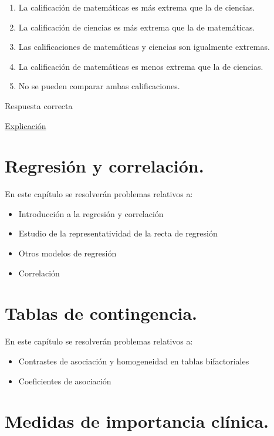 \documentclass[
]{book}
\providecommand{\tightlist}{%
  \setlength{\itemsep}{0pt}\setlength{\parskip}{0pt}}
\begin{document}
\begin{enumerate}
\def\labelenumi{\alph{enumi})}
\tightlist
\item
  La calificación de matemáticas es más extrema que la de ciencias.
\item
  La calificación de ciencias es más extrema que la de matemáticas.
\item
  Las calificaciones de matemáticas y ciencias son igualmente extremas.
\item
  La calificación de matemáticas es menos extrema que la de ciencias.
\item
  No se pueden comparar ambas calificaciones.
\end{enumerate}

Respuesta correcta

\href{https://homepage.divms.uiowa.edu/~mbognar/applets/normal.html}{Explicación}

\hypertarget{regresiuxf3n-y-correlaciuxf3n.}{%
\chapter{Regresión y correlación.}\label{regresiuxf3n-y-correlaciuxf3n.}}

En este capítulo se resolverán problemas relativos a:

\begin{itemize}
\tightlist
\item
  Introducción a la regresión y correlación
\item
  Estudio de la representatividad de la recta de regresión
\item
  Otros modelos de regresión
\item
  Correlación
\end{itemize}

\hypertarget{tablas-de-contingencia.}{%
\chapter{Tablas de contingencia.}\label{tablas-de-contingencia.}}

En este capítulo se resolverán problemas relativos a:

\begin{itemize}
\tightlist
\item
  Contrastes de asociación y homogeneidad en tablas bifactoriales
\item
  Coeficientes de asociación
\end{itemize}

\hypertarget{medidas-de-importancia-cluxednica.}{%
\chapter{Medidas de importancia clínica.}\label{medidas-de-importancia-cluxednica.}}
\end{document}
